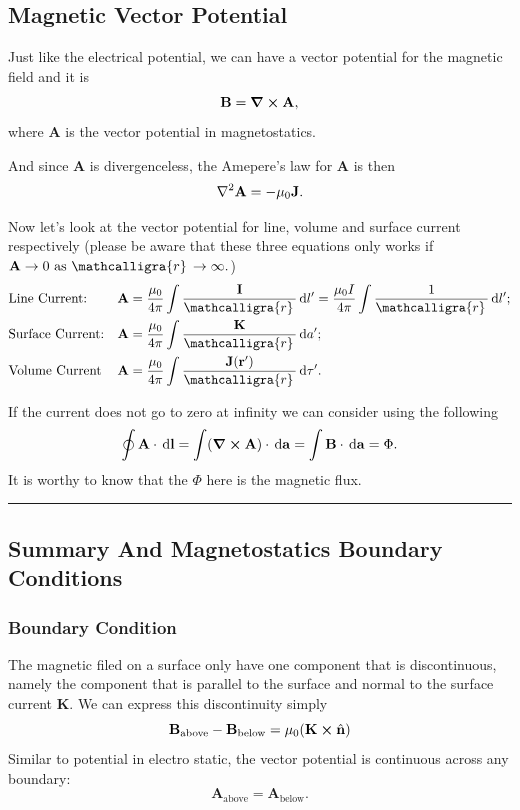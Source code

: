 \documentclass[12pt,english]{article}
\newcommand{\dmr}[1]{\, \mathrm{d}#1} %
\numberwithin{equation}{subsection}
\newcommand{\curly}[1]{\ensuremath{\mathcalligra{#1}\,}}
\let\oldhat\hat
\renewcommand{\vec}[1]{\mathbf{#1}}
\renewcommand{\hat}[1]{\oldhat{\mathbf{#1}}}
\begin{document}
\subsection{Magnetic Vector Potential}
Just like the electrical potential, we can have a vector potential for the magnetic field and it is 
\begin{equation}
    \vec{B} = \curl \vec{A},
\end{equation}
where $\vec{A}$ is the vector potential in magnetostatics.

And since $\vec{A}$ is divergenceless, the Amepere's law for $\vec{A}$ is then 
\begin{equation}
    \laplacian\vec{A} = - \mu_0 \vec{J}.
\end{equation}

Now let's look at the vector potential for line, volume and surface current respectively (please be aware that these three equations only works if $\vec{A} \to 0 \text{ as } \curly{r} \to \infty.$)
\begin{align}
    &\text{Line Current:} &&\vec{A} = \frac{\mu_0}{4 \pi} \int \frac{\vec{I}}{\curly{r}}\dmr{l'} = \frac{\mu_0 I }{4 \pi} \int \frac{1}{\curly{r}}\dmr{l'};\\
    &\text{Surface Current:} &&\vec{A} = \frac{\mu_0 }{4 \pi} \int \frac{\vec{K}}{\curly{r}}\dmr{a'};\\
    &\text{Volume Current} &&\vec{A} = \frac{\mu_0}{4 \pi}\int \frac{\vec{J}(\vec{r'})}{\curly{r}}\dmr{\tau'}.
\end{align}

If the current does not go to zero at infinity we can consider using the following
\begin{equation}
    \oint\vec{A}\cdot\dmr{\vec{l}} = \int (\curl \vec{A}) \cdot \dmr{\vec{a}} = \int \vec{B}\cdot \dmr{\vec{a}} = \Phi.
\end{equation}
It is worthy to know that the $\Phi$ here is the magnetic flux.

\par\noindent\rule{\textwidth}{0.4pt}
\subsection{Summary And Magnetostatics Boundary Conditions}
\subsubsection{Boundary Condition}
The magnetic filed on a surface only have one component that is discontinuous, namely the component that is parallel to the surface and normal to the surface current $\vec{K}$. We can express this discontinuity simply
\begin{equation}
    \vec{B}_{\text{above}} - \vec{B}_{\text{below}} = \mu_0(\vec{K}\cross \hat{n})
\end{equation}
Similar to potential in electro static, the vector potential is continuous across any boundary:
\begin{equation}
    \vec{A}_{\text{above}} = \vec{A}_{\text{below}}.
\end{equation}
\end{document}
